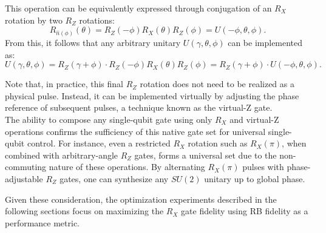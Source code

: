 This operation can be equivalently expressed through conjugation of an $R_X$ rotation by two $R_Z$ rotations:
\begin{equation}
R_{\hat{n}(\phi)}(\theta) = R_Z(-\phi) R_X(\theta) R_Z(\phi) = U(-\phi, \theta, \phi).
\end{equation}
From this, it follows that any arbitrary unitary $ U(\gamma, \theta, \phi) $ can be implemented as:
\begin{equation}
U(\gamma, \theta, \phi) = R_Z(\gamma + \phi) \cdot R_Z(-\phi) R_X(\theta) R_Z(\phi) = R_Z(\gamma + \phi) \cdot U(-\phi, \theta, \phi).
\end{equation}

Note that, in practice, this final $R_Z$ rotation does not need to be realized as a physical pulse. 
Instead, it can be implemented virtually by adjusting the phase reference of subsequent pulses, a technique known as the virtual-Z gate\cite{McKay_2017}. \\
The ability to compose any single-qubit gate using only $R_X$ and virtual-Z operations \cite{boykin1999universalfaulttolerantquantumcomputing} confirms the sufficiency of this native gate set for universal single-qubit control. For instance, even a restricted $ R_X $ rotation such as $ R_X(\pi) $, when combined with arbitrary-angle $ R_Z $ gates, forms a universal set due to the non-commuting nature of these operations. By alternating $ R_X(\pi) $ pulses with phase-adjustable $ R_Z $ gates, one can synthesize any $ SU(2) $ unitary up to global phase.

Given these consideration, the optimization experiments described in the following sections focus on maximizing the $R_X$ gate fidelity using RB fidelity as a performance metric. 

